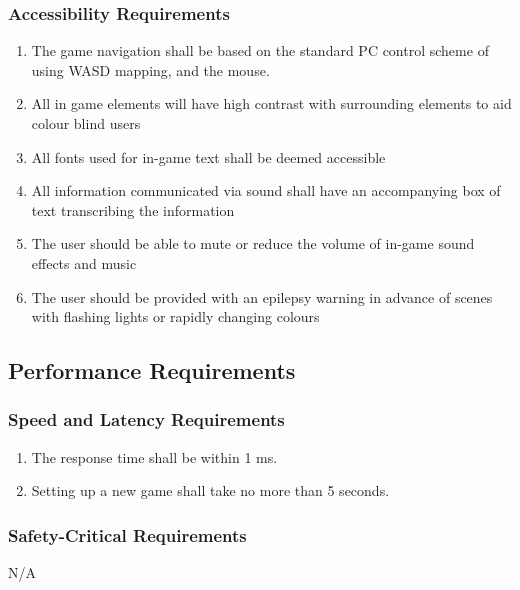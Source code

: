 \documentclass[12pt, titlepage]{article}
\begin{document}
\subsubsection{Accessibility Requirements}
\label{ssub:accessibility_requirements}
\begin{enumerate}[start=8,label={ UH\arabic*.}]
	\item The game navigation shall be based on the standard PC control scheme of using WASD mapping, and the mouse.
	\item All in game elements will have high contrast with surrounding elements to aid colour blind users
	\item All fonts used for in-game text shall be deemed accessible
	\item All information communicated via sound shall have an accompanying box of text transcribing the information
	\item The user should be able to mute or reduce the volume of in-game sound effects and music
	\item The user should be provided with an epilepsy warning in advance of scenes with flashing lights or rapidly changing colours
	
\end{enumerate}


\subsection{Performance Requirements}
\label{sub:performance_requirements}

\subsubsection{Speed and Latency Requirements}
\label{ssub:speed_and_latency_requirements}
\begin{enumerate}[{PR}1. ]
	\item The response time shall be within 1 ms.
	\item Setting up a new game shall take no more than 5 seconds.
\end{enumerate}

\subsubsection{Safety-Critical Requirements}
\label{ssub:safety_critical_requirements}
N/A
\end{document}
